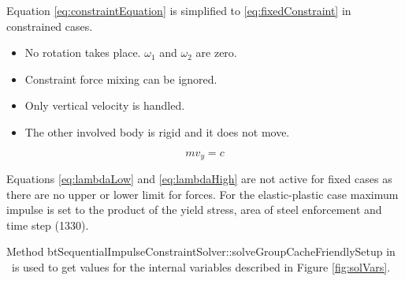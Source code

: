 Equation \ref{eq:constraintEquation} is simplified
to \ref{eq:fixedConstraint} in constrained cases.
\begin{itemize}
\item No rotation takes place. $\omega_1$ and $\omega_2$ are zero.
\item Constraint force mixing can be ignored.
\item Only vertical velocity is handled.
\item The other involved body is rigid and it does not move.
\end{itemize} 

\begin{equation} \label{eq:fixedConstraint}
m v_y = c 
\end{equation}

Equations \ref{eq:lambdaLow} and \ref{eq:lambdaHigh} are not active for fixed cases as
there are no upper or lower limit for forces.
For the elastic-plastic case maximum impulse is set to the product of the yield stress, 
area of steel enforcement and time step (1330).

Method btSequentialImpulseConstraintSolver::solveGroupCacheFriendlySetup
in \bullet\ is used to get values for the internal variables described in Figure \ref{fig:solVars}. 

